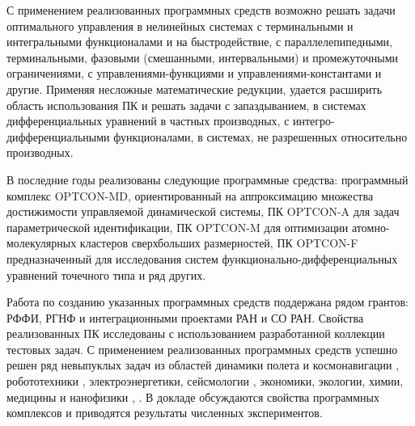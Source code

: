 С применением реализованных программных средств возможно решать задачи оптимального управления в нелинейных системах с терминальными и интегральными функционалами и на быстродействие, с параллелепипедными, терминальными, фазовыми (смешанными, интервальными) и промежуточными ограничениями, с управлениями-функциями и управлениями-константами и другие. Применяя несложные математические редукции, удается расширить область использования ПК и решать задачи с запаздыванием, в системах дифференциальных уравнений в частных производных, с интегро-дифференциальными функционалами, в системах, не разрешенных относительно производных. 

В последние годы реализованы следующие программные средства: программный комплекс OPTCON-MD, ориентированный на аппроксимацию множества достижимости уп\-равляемой динамической системы, ПК OPTCON-A для задач параметрической идентификации, ПК OPTCON-M для оптимизации атомно-молекулярных кластеров сверхбольших размерностей, ПК OPTCON-F предназначенный для исследования систем функцио\-нально-дифференциальных уравнений точечного типа и ряд других.

Работа по созданию указанных программных средств поддержана рядом грантов: РФФИ, РГНФ и интеграционными проектами РАН и СО РАН. Свойства реализованных ПК исследованы с использованием разработанной коллекции тестовых задач. С применением реализованных программных средств успешно решен ряд невыпуклых задач из областей динамики полета и космонавигации \cite{Gor16}, робототехники \cite{Sor}, электроэнергетики, сейсмологии \cite{Ber}, экономики, экологии, химии, медицины \cite{Gor18} и нанофизики \cite{Sham}, \cite{Nen}. В докладе обсуждаются свойства программных комплексов и приводятся результаты численных экспериментов.





